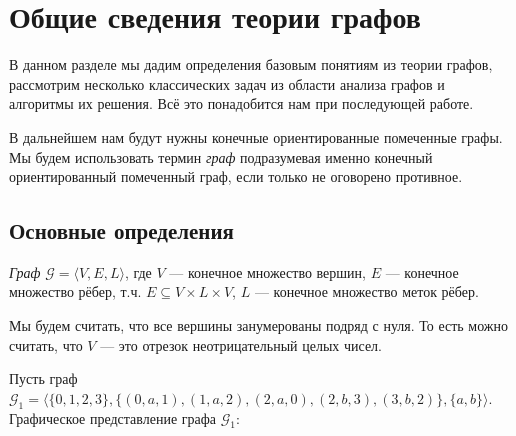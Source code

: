 \chapter{Общие сведения теории графов}

В данном разделе мы дадим определения базовым понятиям из теории графов, рассмотрим несколько классических задач из области анализа графов и алгоритмы их решения.
Всё это понадобится нам при последующей работе.

В дальнейшем нам будут нужны конечные ориентированные помеченные графы.
Мы будем использовать термин \textit{граф} подразумевая именно конечный ориентированный помеченный граф, если только не оговорено противное.

\section{Основные определения}

\begin{definition}
  \textit{Граф} $\mathcal{G} = \langle V, E, L \rangle$, где $V$ --- конечное множество вершин, $E$ --- конечное множество рёбер, т.ч. $E \subseteq V \times L \times V$, $L$ --- конечное множество меток рёбер.
\end{definition}

Мы будем считать, что все вершины занумерованы подряд с нуля.
То есть можно считать, что $V$ --- это отрезок неотрицательный целых чисел.

\begin{example}
  Пусть граф \\ $\mathcal{G}_1 = \langle \{0,1,2,3\}, \{(0,a,1), (1,a,2), (2,a,0), (2,b,3), (3,b,2)\}, \{a,b\} \rangle$.
  Графическое представление графа $\mathcal{G}_1$:
  \begin{center}
  \end{center}
\end{example}

